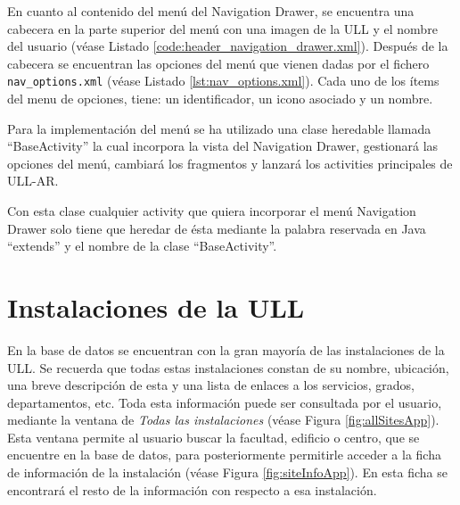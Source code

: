 

En cuanto al contenido del menú del Navigation Drawer, se encuentra una cabecera en la parte superior del menú con una imagen de la ULL y el nombre del usuario (véase Listado \ref{code:header_navigation_drawer.xml}). Después de la cabecera se encuentran las opciones del menú que vienen dadas por el fichero \texttt{nav\_options.xml} (véase Listado \ref{lst:nav_options.xml}). Cada uno de los ítems del menu de opciones, tiene: un identificador, un icono asociado y un nombre.


   
\bigskip



Para la implementación del menú se ha utilizado una clase heredable llamada ``BaseActivity'' la cual incorpora la vista del Navigation Drawer, gestionará las opciones del menú, cambiará los fragmentos y lanzará los activities principales de ULL-AR. 



Con esta clase cualquier activity que quiera incorporar el menú Navigation Drawer  solo tiene que heredar de ésta mediante la palabra reservada en Java ``extends'' y el nombre de la clase ``BaseActivity''.

        
\section{Instalaciones de la ULL}

En la base de datos se encuentran con la gran mayoría de las instalaciones de la ULL. Se recuerda que todas estas instalaciones constan de su nombre, ubicación, una breve descripción de esta y una lista de enlaces a los servicios, grados, departamentos, etc. Toda esta información puede ser consultada por el usuario, mediante la ventana de \textit{Todas las instalaciones} (véase Figura \ref{fig:allSitesApp}). Esta ventana permite al usuario buscar la facultad, edificio o centro, que se encuentre en la base de datos, para posteriormente permitirle acceder a la ficha de información de la instalación (véase Figura \ref{fig:siteInfoApp}). En esta ficha se encontrará el resto de la información con respecto a esa instalación.

